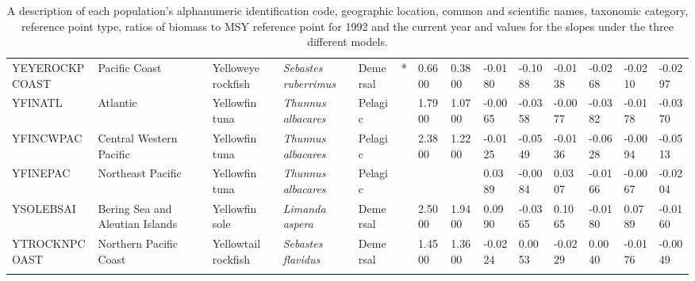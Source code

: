 \begin{longtable}{p{2.6cm}p{1.9cm}p{1.7cm}p{1.6cm}p{1cm}p{0.3cm}p{1cm}p{1cm}p{1cm}p{1.1cm}p{1cm}p{1.1cm}p{1cm}p{1.1cm}}
  YEYEROCKPCOAST & Pacific Coast & Yelloweye rockfish & \textit{Sebastes ruberrimus} & Demersal & * & 0.6600 & 0.3800 & -0.0180 & -0.1088 & -0.0138 & -0.0268 & -0.0210 & -0.0297 \\ 
  YFINATL & Atlantic & Yellowfin tuna & \textit{Thunnus albacares} & Pelagic &   & 1.7900 & 1.0700 & -0.0065 & -0.0358 & -0.0077 & -0.0382 & -0.0178 & -0.0370 \\ 
  YFINCWPAC & Central Western Pacific & Yellowfin tuna & \textit{Thunnus albacares} & Pelagic &   & 2.3800 & 1.2200 & -0.0125 & -0.0549 & -0.0136 & -0.0628 & -0.0094 & -0.0513 \\ 
  YFINEPAC & Northeast Pacific & Yellowfin tuna & \textit{Thunnus albacares} & Pelagic &  &  &  & 0.0389 & -0.0084 & 0.0307 & -0.0166 & -0.0067 & -0.0204 \\ 
  YSOLEBSAI & Bering Sea and Aleutian Islands & Yellowfin sole & \textit{Limanda aspera} & Demersal &   & 2.5000 & 1.9400 & 0.0990 & -0.0365 & 0.1065 & -0.0180 & 0.0789 & -0.0160 \\ 
  YTROCKNPCOAST & Northern Pacific Coast & Yellowtail rockfish & \textit{Sebastes flavidus} & Demersal &   & 1.4500 & 1.3600 & -0.0224 & 0.0053 & -0.0229 & 0.0040 & -0.0176 & -0.0049 \\ 
   \hline
\hline
\caption{A description of each population's alphanumeric identification code, geographic location, common and scientific names, taxonomic category, reference point type, ratios of biomass to MSY reference point for 1992 and the current year and values for the slopes under the three different models.}
\label{tab:S1}
\end{longtable}
